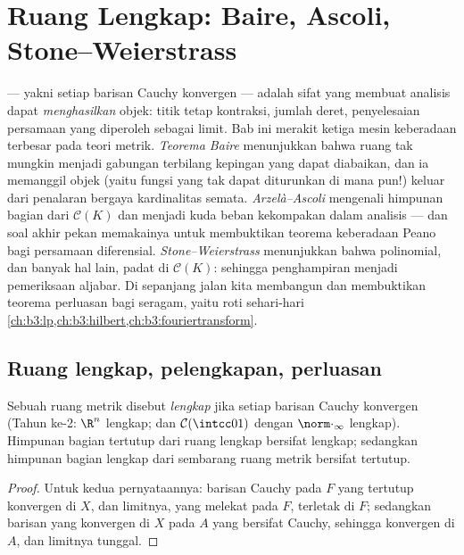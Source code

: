 \chapter{Ruang Lengkap: Baire, Ascoli, Stone--Weierstrass}
\label{ch:b3:complete}

 --- yakni setiap barisan Cauchy konvergen --- adalah
sifat yang membuat analisis dapat \emph{menghasilkan} objek: titik tetap
kontraksi, jumlah deret, penyelesaian persamaan yang diperoleh
sebagai limit. Bab ini merakit ketiga mesin keberadaan
terbesar pada teori metrik. \emph{Teorema Baire} menunjukkan bahwa
ruang  tak mungkin menjadi gabungan terbilang kepingan yang
dapat diabaikan, dan ia memanggil objek (yaitu fungsi  yang tak
dapat diturunkan di mana pun!) keluar dari penalaran bergaya kardinalitas semata.
\emph{Arzelà--Ascoli} mengenali himpunan bagian  dari
$\mathcal C(K)$ dan menjadi kuda beban kekompakan dalam analisis --- dan
soal akhir pekan memakainya untuk membuktikan teorema keberadaan Peano bagi
persamaan diferensial. \emph{Stone--Weierstrass} menunjukkan bahwa
polinomial, dan banyak hal lain, padat di $\mathcal C(K)$: sehingga
penghampiran menjadi pemeriksaan aljabar. Di sepanjang jalan kita
membangun  dan membuktikan teorema perluasan bagi
 seragam, yaitu roti sehari-hari
\cref{ch:b3:lp,ch:b3:hilbert,ch:b3:fouriertransform}.

\section{Ruang lengkap, pelengkapan, perluasan}

\begin{definition}\label{def:b3:complete:complete}
Sebuah ruang metrik disebut \emph{lengkap} jika
setiap barisan Cauchy konvergen (Tahun ke-2: $\R^n$ lengkap; dan
$\mathcal C(\intcc01)$ dengan $\norm\cdot_\infty$ lengkap).
Himpunan bagian tertutup dari ruang lengkap bersifat lengkap; sedangkan himpunan bagian lengkap
dari sembarang ruang metrik bersifat tertutup.
\end{definition}

\begin{proof}
Untuk kedua pernyataannya: barisan Cauchy pada $F$ yang tertutup
konvergen di $X$, dan limitnya, yang melekat pada $F$, terletak di $F$; sedangkan
barisan yang konvergen di $X$ pada $A$ yang  bersifat Cauchy, sehingga
konvergen di $A$, dan limitnya tunggal.
\end{proof}

